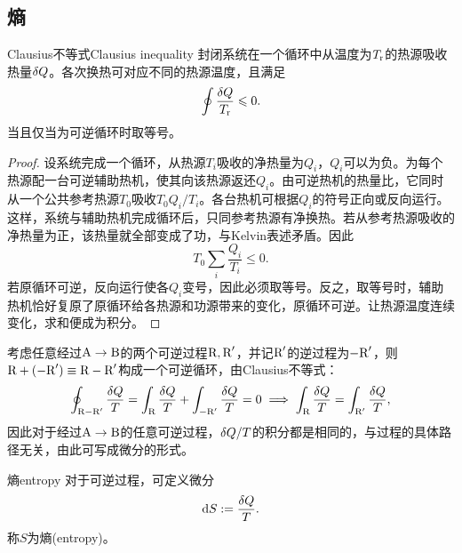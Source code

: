 
\subsection{熵}

\begin{theorem}{Clausius不等式}{Clausius inequality}
	封闭系统在一个循环中从温度为$T_\mathrm r$的热源吸收热量$\mathop{}\!\delta Q$。各次换热可对应不同的热源温度，且满足
	\begin{equation}
		\oint\frac{\mathop{}\!\delta Q}{T_\mathrm r} \leqslant 0.
	\end{equation}
	当且仅当为可逆循环时取等号。
\end{theorem}

\begin{proof}
	设系统完成一个循环，从热源$T_i$吸收的净热量为$Q_i$，$Q_i$可以为负。为每个热源配一台可逆辅助热机，使其向该热源返还$Q_i$。由可逆热机的热量比，它同时从一个公共参考热源$T_0$吸收$T_0 Q_i/T_i$。各台热机可根据$Q_i$的符号正向或反向运行。
	这样，系统与辅助热机完成循环后，只同参考热源有净换热。若从参考热源吸收的净热量为正，该热量就全部变成了功，与Kelvin表述矛盾。因此
	\[
		T_0\sum_i\frac{Q_i}{T_i} \leq 0 .
	\]
	若原循环可逆，反向运行使各$Q_i$变号，因此必须取等号。反之，取等号时，辅助热机恰好复原了原循环给各热源和功源带来的变化，原循环可逆。让热源温度连续变化，求和便成为积分。
\end{proof}

\begin{corollary}
	考虑任意经过$\text A \to \text B$的两个可逆过程$\text R,\text R'$，并记$\text R'$的逆过程为$-\text R'$，则$\text R + (-\text R') \equiv \text R - \text R'$构成一个可逆循环，由Clausius不等式：
	\[
		\oint_{\text R-\text R'}\frac{\mathop{}\!\delta Q}T = \int_\text R\frac{\mathop{}\!\delta Q}T + \int_{-\text R'}\frac{\mathop{}\!\delta Q}T = 0 \implies
		\int_\text R\frac{\mathop{}\!\delta Q}T = \int_{\text R'}\frac{\mathop{}\!\delta Q}T,
	\]
	因此对于经过$\text A \to \text B$的任意可逆过程，$\mathop{}\!\delta Q/T$的积分都是相同的，与过程的具体路径无关，由此可写成微分的形式。
\end{corollary}

\begin{definition}
	{熵}{entropy}
	对于可逆过程，可定义微分
	\begin{equation}
		\label{eqn:dS=dQ/T}
		\mathop{}\!\mathrm{d} S := \frac{\mathop{}\!\delta Q}T.
	\end{equation}
	称$S$为熵(entropy)。
\end{definition}

